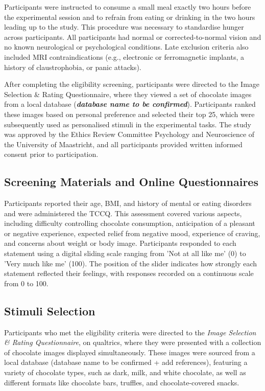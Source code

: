 \documentclass[]{imag-ms-template}
\begin{document}
Participants were instructed to consume a small meal exactly two hours before the experimental session and to refrain from eating or drinking in the two hours leading up to the study. This procedure was necessary to standardise hunger across participants. All participants had normal or corrected-to-normal vision and no known neurological or psychological conditions. Late exclusion criteria also included MRI contraindications (e.g., electronic or ferromagnetic implants, a history of claustrophobia, or panic attacks).

After completing the eligibility screening, participants were directed to the Image Selection \& Rating Questionnaire, where they viewed a set of chocolate images from a local database (\textbf{\textit{database name to be confirmed}}). Participants ranked these images based on personal preference and selected their top 25, which were subsequently used as personalised stimuli in the experimental tasks. The study was approved by the Ethics Review Committee Psychology and Neuroscience of the University of Maastricht, and all participants provided written informed consent prior to participation.

\subsection{Screening Materials and Online Questionnaires}
Participants reported their age, BMI, and history of mental or eating disorders and were administered the TCCQ. This assessment covered various aspects, including difficulty controlling chocolate consumption, anticipation of a pleasant or negative experience, expected relief from negative mood, experience of craving, and concerns about weight or body image. Participants responded to each statement using a digital sliding scale ranging from 'Not at all like me' (0) to 'Very much like me' (100). The position of the slider indicates how strongly each statement reflected their feelings, with responses recorded on a continuous scale from 0 to 100.


\subsection{Stimuli Selection}
Participants who met the eligibility criteria were directed to the \textit{Image Selection \& Rating Questionnaire}, on qualtrics, where they were presented with a collection of chocolate images displayed simultaneously. These images were sourced from a local database (database name to be confirmed + add references), featuring a variety of chocolate types, such as dark, milk, and white chocolate, as well as different formats like chocolate bars, truffles, and chocolate-covered snacks.
\end{document}
